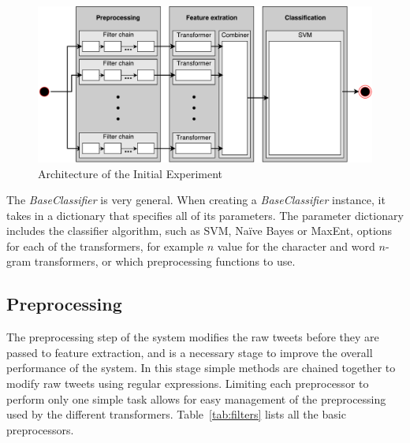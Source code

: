 \begin{figure}[t]
    \begin{center}
        \includegraphics[width=\textwidth]{./figs/core_architecture}
    \end{center}
    \caption{Architecture of the Initial Experiment}
    \label{fig:core_architecture}
\end{figure}

The \textit{BaseClassifier} is very general. When creating a \textit{BaseClassifier} instance, it takes in a dictionary that specifies all of its parameters. The parameter dictionary includes the classifier algorithm, such as SVM, Naïve Bayes or MaxEnt, options for each of the transformers, for example $n$ value for the character and word $n$-gram transformers, or which preprocessing functions to use.

\subsection{Preprocessing}
The preprocessing step of the system modifies the raw tweets before they are passed to feature extraction, and is a necessary stage to improve the overall performance of the system. In this stage simple methods are chained together to modify raw tweets using regular expressions. Limiting each preprocessor to perform only one simple task allows for easy management of the preprocessing used by the different transformers. Table~\ref{tab:filters} lists all the basic preprocessors.

